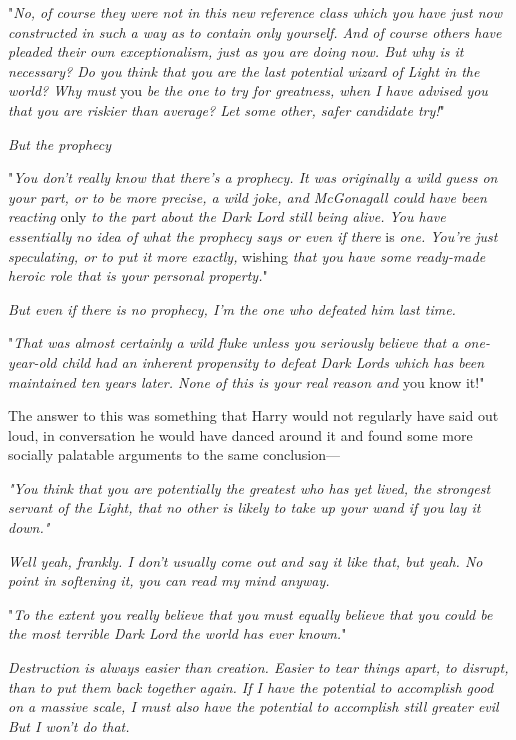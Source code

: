 "\emph{No, of course they were not in this new reference class which you have
just now constructed in such a way as to contain only yourself. And of course
others have pleaded their own exceptionalism, just as you are doing now. But
why is it necessary? Do you think that you are the last potential wizard of
Light in the world? Why must} you \emph{be the one to try for greatness, when I
have advised you that you are riskier than average? Let some other, safer
candidate try!}"

\emph{But the prophecy{\el}}

"\emph{You don't really know that there's a prophecy. It was originally a wild
guess on your part, or to be more precise, a wild joke, and McGonagall could
have been reacting} only \emph{to the part about the Dark Lord still being
alive. You have essentially no idea of what the prophecy says or even if there}
is \emph{one. You're just speculating, or to put it more exactly,} wishing
\emph{that you have some ready-made heroic role that is your personal
property.}"

\emph{But even if there is no prophecy, I'm the one who defeated him last time.}

"\emph{That was almost certainly a wild fluke unless you seriously believe that
a one-year-old child had an inherent propensity to defeat Dark Lords which has
been maintained ten years later. None of this is your real reason and} you know
it!"

The answer to this was something that Harry would not regularly have said out
loud, in conversation he would have danced around it and found some more
socially palatable arguments to the same conclusion---

\emph{"You think that you are potentially the greatest who has yet lived, the
strongest servant of the Light, that no other is likely to take up your wand if
you lay it down."}

\emph{Well{\el} yeah, frankly. I don't usually come out and say it like
that, but yeah. No point in softening it, you can read my mind anyway.}

"\emph{To the extent you really believe that{\el} you must equally believe
that you could be the most terrible Dark Lord the world has ever known.}"

\emph{Destruction is always easier than creation. Easier to tear things apart,
to disrupt, than to put them back together again. If I have the potential to
accomplish good on a massive scale, I must also have the potential to
accomplish still greater evil{\el} But I won't do that.}

